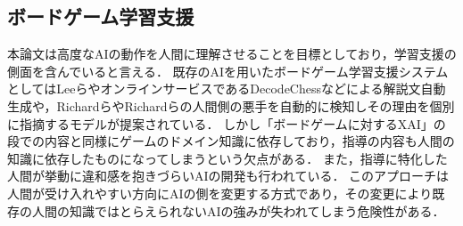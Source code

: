 \subsection{ボードゲーム学習支援}
本論文は高度なAIの動作を人間に理解させることを目標としており，学習支援の側面を含んでいると言える．
既存のAIを用いたボードゲーム学習支援システムとしてはLeeら\cite{ChessComments}やオンラインサービスであるDecodeChess\cite{DecodeChess}などによる解説文自動生成や，Richard\cite{badMoves2016}らやRichard\cite{badMoves2017}らの人間側の悪手を自動的に検知しその理由を個別に指摘するモデルが提案されている．
しかし「ボードゲームに対するXAI」の段での内容と同様にゲームのドメイン知識に依存しており，指導の内容も人間の知識に依存したものになってしまうという欠点がある．
また，指導に特化した人間が挙動に違和感を抱きづらいAIの開発も行われている\cite{natural}\cite{maia}．
このアプローチは人間が受け入れやすい方向にAIの側を変更する方式であり，その変更により既存の人間の知識ではとらえられないAIの強みが失われてしまう危険性がある．


